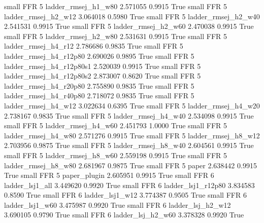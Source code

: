      small      FFR                 5      ladder_rmsej_h1_w80   2.571055      0.9915    True
     small      FFR                 5      ladder_rmsej_h2_w12   3.064018      0.5980    True
     small      FFR                 5      ladder_rmsej_h2_w40   2.541531      0.9915    True
     small      FFR                 5      ladder_rmsej_h2_w60   2.470038      0.9915    True
     small      FFR                 5      ladder_rmsej_h2_w80   2.531631      0.9915    True
     small      FFR                 5      ladder_rmsej_h4_r12   2.786686      0.9835    True
     small      FFR                 5   ladder_rmsej_h4_r12p80   2.690026      0.9895    True
     small      FFR                 5 ladder_rmsej_h4_r12p80s1   2.520039      0.9915    True
     small      FFR                 5 ladder_rmsej_h4_r12p80s2   2.873007      0.8620    True
     small      FFR                 5   ladder_rmsej_h4_r20p80   2.755890      0.9835    True
     small      FFR                 5   ladder_rmsej_h4_r40p80   2.718072      0.9835    True
     small      FFR                 5      ladder_rmsej_h4_w12   3.022634      0.6395    True
     small      FFR                 5      ladder_rmsej_h4_w20   2.738167      0.9835    True
     small      FFR                 5      ladder_rmsej_h4_w40   2.534098      0.9915    True
     small      FFR                 5      ladder_rmsej_h4_w60   2.451793      1.0000    True
     small      FFR                 5      ladder_rmsej_h4_w80   2.571276      0.9915    True
     small      FFR                 5      ladder_rmsej_h8_w12   2.703956      0.9875    True
     small      FFR                 5      ladder_rmsej_h8_w40   2.604561      0.9915    True
     small      FFR                 5      ladder_rmsej_h8_w60   2.559198      0.9915    True
     small      FFR                 5      ladder_rmsej_h8_w80   2.681967      0.9875    True
     small      FFR                 5                    paper   2.638442      0.9915    True
     small      FFR                 5             paper_plugin   2.605951      0.9915    True
     small      FFR                 6          ladder_lsj1_all   3.449620      0.9920    True
     small      FFR                 6       ladder_lsj1_r12p80   3.834583      0.8590    True
     small      FFR                 6          ladder_lsj1_w12   3.774387      0.9505    True
     small      FFR                 6          ladder_lsj1_w60   3.475987      0.9920    True
     small      FFR                 6        ladder_lsj_h2_w12   3.690105      0.9790    True
     small      FFR                 6        ladder_lsj_h2_w60   3.378328      0.9920    True

